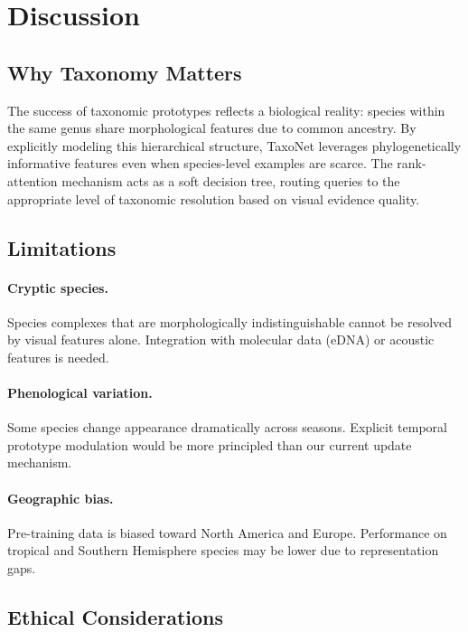 \section{Discussion}

\label{sec:discussion}

\subsection{Why Taxonomy Matters}

The success of taxonomic prototypes reflects a biological reality:
species within the same genus share morphological features due to common
ancestry. By explicitly modeling this hierarchical structure, TaxoNet
leverages phylogenetically informative features even when species-level
examples are scarce. The rank-attention mechanism acts as a soft decision
tree, routing queries to the appropriate level of taxonomic resolution
based on visual evidence quality.

\subsection{Limitations}

\paragraph{Cryptic species.} Species complexes that are
morphologically indistinguishable cannot be resolved by visual features
alone. Integration with molecular data (eDNA) or acoustic features is
needed.

\paragraph{Phenological variation.} Some species change appearance
dramatically across seasons. Explicit temporal prototype modulation
would be more principled than our current update mechanism.

\paragraph{Geographic bias.} Pre-training data is biased toward North
America and Europe. Performance on tropical and Southern Hemisphere
species may be lower due to representation gaps.

\subsection{Ethical Considerations}

